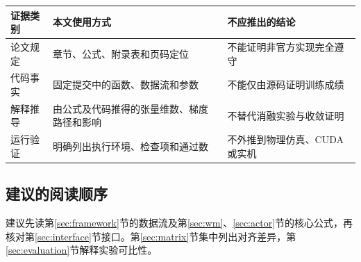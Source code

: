 \noindent\begin{tabularx}{\textwidth}{@{}P{20mm}Y Y@{}}
\toprule
证据类别 & 本文使用方式 & 不应推出的结论\\
\midrule
论文规定 & 章节、公式、附录表和页码定位 & 不能证明非官方实现完全遵守\\
代码事实 & 固定提交中的函数、数据流和参数 & 不能仅由源码证明训练成绩\\
解释推导 & 由公式及代码推得的张量维数、梯度路径和影响 & 不替代消融实验与收敛证明\\
运行验证 & 明确列出执行环境、检查项和通过数 & 不外推到物理仿真、CUDA 或实机\\
\bottomrule
\end{tabularx}

\subsection{建议的阅读顺序}
建议先读第\ref{sec:framework}节的数据流及第\ref{sec:wm}、\ref{sec:actor}节的核心公式，再核对第\ref{sec:interface}节接口。第\ref{sec:matrix}节集中列出对齐差异，第\ref{sec:evaluation}节解释实验可比性。
